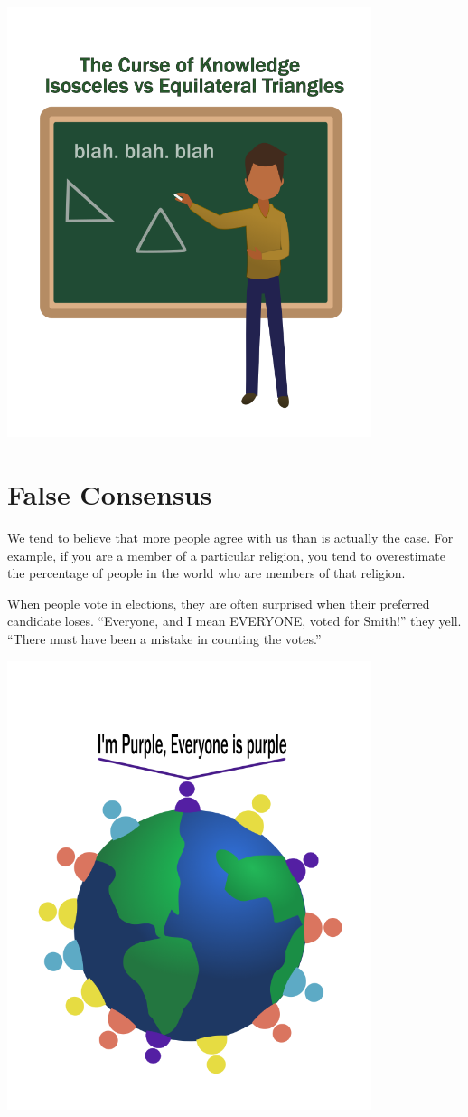 \includegraphics[width=0.8\textwidth]{bias_COK.png}

\section{False Consensus}

We tend to believe that more people agree with us than is actually
the case. For example, if you are a member of a particular religion,
you tend to overestimate the percentage of people in the world who are
members of that religion.

When people vote in elections, they are often surprised when their
preferred candidate loses. ``Everyone, and I mean EVERYONE, voted for
Smith!'' they yell.  ``There must have been a mistake in counting the
votes.''

\includegraphics[width=0.8\textwidth]{bias_FC.png}

